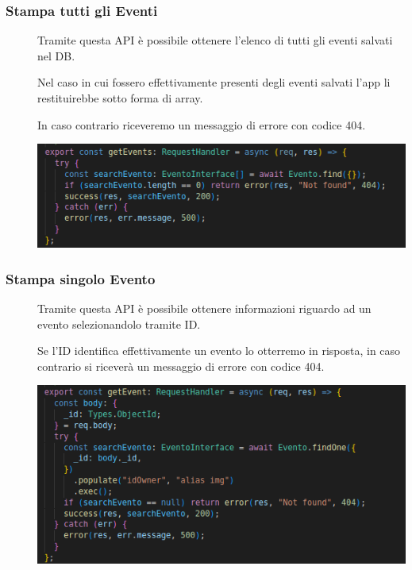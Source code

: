 \documentclass{article}
\begin{document}
\subsubsection{Stampa tutti gli Eventi}
\begin{description}
    \item[] Tramite questa API è possibile ottenere l'elenco di tutti gli eventi salvati nel DB.
    \item[] Nel caso in cui fossero effettivamente presenti degli eventi salvati l'app li restituirebbe sotto forma di array.
    \item[] In caso contrario riceveremo un messaggio di errore con codice 404.
    \item[] \begin{center}
            \includegraphics[scale=0.5]{allEvent.png}
        \end{center}
\end{description}
\clearpage
\subsubsection{Stampa singolo Evento}
\begin{description}
    \item[] Tramite questa API è possibile ottenere informazioni riguardo ad un evento selezionandolo tramite ID.
    \item[] Se l'ID identifica effettivamente un evento lo otterremo in risposta, in caso contrario si riceverà un messaggio di errore con codice 404.
    \item[] \begin{center}
            \includegraphics[scale=0.5]{getEvent.png}
        \end{center}
\end{description}
\end{document}
